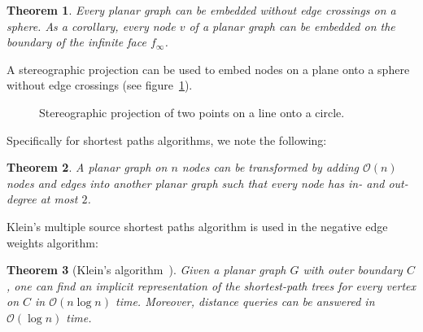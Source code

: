 \documentclass[11pt]{article}
\newtheorem{theorem}{Theorem}[section]
\begin{document}
\begin{theorem}
  Every planar graph can be embedded without edge crossings on a sphere. As a corollary, every node $v$ of a planar graph can be embedded on the boundary of the infinite face $f_{\infty}$.
\end{theorem}

A stereographic projection can be used to embed nodes on a plane onto a sphere without edge crossings (see figure~\ref{fig:stereo}).

\begin{figure}[!htb]
  \centering
  \caption{Stereographic projection of two points on a line onto a circle.}
  \label{fig:stereo}
\end{figure}

Specifically for shortest paths algorithms, we note the following:\\

\begin{theorem}
  A planar graph on $n$ nodes can be transformed by adding $\mathcal{O}(n)$ nodes and edges into another planar graph such that every node has in- and out-degree at most $2$.
\end{theorem}

Klein's multiple source shortest paths algorithm is used in the negative edge weights algorithm:\\

\begin{theorem}[Klein's algorithm~\cite{klein2005multiple}]
Given a planar graph $G$ with outer boundary $C$, one can find an implicit representation of the shortest-path trees for every vertex on $C$ in $\mathcal{O}(n\log n)$ time. Moreover, distance queries can be answered in $\mathcal{O}(\log n)$ time.
\end{theorem}
\end{document}
